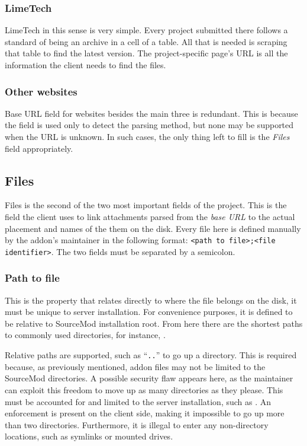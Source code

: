\subsubsection{LimeTech}

LimeTech in this sense is very simple.
Every project submitted there follows a standard of being an archive in a cell of a table.
All that is needed is scraping that table to find the latest version.
The project-specific page's URL is all the information the client needs to find the files.

\subsubsection{Other websites}

Base URL field for websites besides the main three is redundant.
This is because the field is used only to detect the parsing method, but none may be supported when the URL is unknown.
In such cases, the only thing left to fill is the \textit{Files} field appropriately.

\subsection{Files}

Files is the second of the two most important fields of the project.
This is the field the client uses to link attachments parsed from the \textit{base URL} to the actual placement and names of the them on the disk.
Every file here is defined manually by the addon's maintainer in the following format: \verb|<path to file>;<file identifier>|.
The two fields must be separated by a semicolon.

\subsubsection{Path to file}

This is the property that relates directly to where the file belongs on the disk, it must be unique to server installation.
For convenience purposes, it is defined to be relative to SourceMod installation root.
From here there are the shortest paths to commonly used directories, for instance, .

Relative paths are supported, such as ``\verb|..|'' to go up a directory.
This is required because, as previously mentioned, addon files may not be limited to the SourceMod directories.
A possible security flaw appears here, as the maintainer can exploit this freedom to move up as many directories as they please.
This must be accounted for and limited to the server installation, such as .
An enforcement is present on the client side, making it impossible to go up more than two directories.
Furthermore, it is illegal to enter any non-directory locations, such as symlinks or mounted drives.

